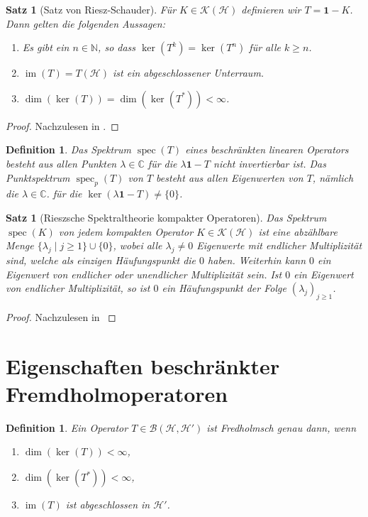 \documentclass[11pt, hidelinks]{article}
\newcommand{\h}{\mathcal{H}}
\newcommand{\spec}{\operatorname{spec}}
\newcommand{\im}{\operatorname{im}}
\numberwithin{conj}{section}
\newtheorem{definition}[conj]{Definition}
\newtheorem{theorem}[conj]{Satz}
\begin{document}
\begin{theorem}[Satz von Riesz-Schauder]
Für $K \in \mathcal{K}(\h)$ definieren wir $T = \mathbf{1}-K$. Dann gelten die folgenden Aussagen:
\begin{enumerate}
    \item Es gibt ein $n \in \mathbb{N}$, so dass $\ker(T^k) = \ker(T^n)$ für alle $k \geq n$.
    \item $\im(T) = T(\h)$ ist ein abgeschlossener Unterraum.
    \item $\dim(\ker(T)) = \dim(\ker(T^\ast)) < \infty$.
\end{enumerate}
\end{theorem}

\begin{proof}
Nachzulesen in \cite[Satz VI.2.1, Lemma VI.2.2]{werner2018funktionalanalysis}.
\end{proof}

\begin{definition}
    Das Spektrum $\spec(T)$ eines beschränkten linearen Operators besteht aus allen Punkten $\lambda \in \mathbb{C}$ für die $\lambda \mathbf{1} - T$ nicht invertierbar ist. Das Punktspektrum $\spec_p(T)$ von $T$ besteht aus allen Eigenwerten von $T$, nämlich die $\lambda \in \mathbb{C}$. für die $\ker(\lambda \mathbf{1} - T) \neq \{0\}$.
\end{definition}

\begin{theorem}[Rieszsche Spektraltheorie kompakter Operatoren]
\label{Riesz}
Das Spektrum $\spec(K)$ von jedem kompakten Operator $K \in \mathcal{K}(\h)$ ist eine abzählbare Menge $\{\lambda_j \; \vert \; j \geq 1\} \cup \{0\}$, wobei alle $\lambda_j \neq 0$ Eigenwerte mit endlicher Multiplizität sind, welche als einzigen Häufungspunkt die $0$ haben. Weiterhin kann $0$ ein Eigenwert von endlicher oder unendlicher Multiplizität sein. Ist $0$ ein Eigenwert von endlicher Multiplizität, so ist $0$ ein Häufungspunkt der Folge $(\lambda_j)_{j \geq 1}$.
\end{theorem}

\begin{proof}
Nachzulesen in \cite[VI.2.5]{werner2018funktionalanalysis}
\end{proof}

\section{Eigenschaften beschränkter Fremdholmoperatoren}
\begin{definition}
    Ein Operator $T \in \mathcal{B}(\h,\h')$ ist Fredholmsch genau dann, wenn
    \begin{enumerate}
        \item $\dim(\ker(T)) < \infty$,
        \item $\dim(\ker(T^\ast)) < \infty$,
        \item $\im(T)$ ist abgeschlossen in $\h'$.
    \end{enumerate}
\end{definition}
\end{document}
